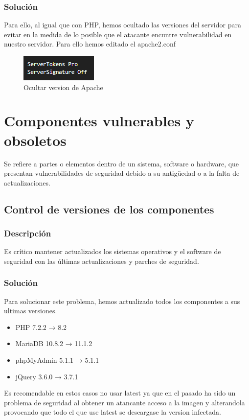 \documentclass{report}
\begin{document}
                \subsubsection{Solución}
                    Para ello, al igual que con PHP, hemos ocultado las versiones del servidor para evitar en la medida de lo posible que el atacante encuntre vulnerabilidad en nuestro servidor. Para ello hemos editado el apache2.conf
                    \begin{figure}[H]
                        \centering
                        \includegraphics[width=\textwidth]{./img/vulnerabilidades/3.5/15.1.png}
                        \caption{Ocultar version de Apache}
                    \end{figure}
            \clearpage
        \section{Componentes vulnerables y obsoletos}
            Se refiere a partes o elementos dentro de un sistema, software o hardware, que presentan vulnerabilidades de seguridad debido a su antigüedad o a la falta de actualizaciones.
            \subsection{Control de versiones de los componentes}
                \subsubsection{Descripción}
                    Es crítico mantener actualizados los sistemas operativos y el software de seguridad con las últimas actualizaciones y parches de seguridad.
                \subsubsection{Solución}
                    Para solucionar este problema, hemos actualizado todos los componentes a sus ultimas versiones.
                    \begin{itemize}
                        \item PHP 7.2.2 → 8.2
                        \item MariaDB 10.8.2 → 11.1.2
                        \item phpMyAdmin 5.1.1 → 5.1.1
                        \item jQuery 3.6.0 → 3.7.1
                    \end{itemize}
                    Es recomendable en estos casos no usar latest ya que en el pasado ha sido un problema de seguridad al obtener un atancante acceso a la imagen y alterandola provocando que todo el que use latest se descargase la version infectada.
            \clearpage
\end{document}
